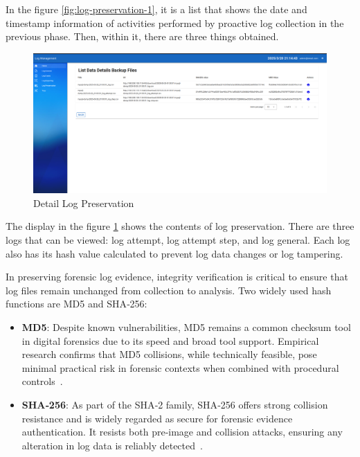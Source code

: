 In the figure \ref{fig:log-preservation-1}, it is a list that shows the date and timestamp information of activities performed by proactive log collection in the previous phase. Then, within it, there are three things obtained.

\begin{figure}[H] 
	\centering
	\includegraphics[width=18cm]{figure/log_preservation_detail.png}
	\caption{Detail Log Preservation}
	\label{fig:log-preservation-2}
\end{figure}

The display in the figure \ref{fig:log-preservation-2} shows the contents of log preservation. There are three logs that can be viewed: log attempt, log attempt step, and log general. Each log also has its hash value calculated to prevent log data changes or log tampering.

In preserving forensic log evidence, integrity verification is critical to ensure that log files remain unchanged from collection to analysis. Two widely used hash functions are MD5 and SHA‑256:
\begin{itemize}
	\item \textbf{MD5}: Despite known vulnerabilities, MD5 remains a common checksum tool in digital forensics due to its speed and broad tool support. Empirical research confirms that MD5 collisions, while technically feasible, pose minimal practical risk in forensic contexts when combined with procedural controls~\cite{easttom2021cryptographic, kessler2016impact}.
	\item \textbf{SHA‑256}: As part of the SHA‑2 family, SHA‑256 offers strong collision resistance and is widely regarded as secure for forensic evidence authentication. It resists both pre‑image and collision attacks, ensuring any alteration in log data is reliably detected~\cite{pagefreezer_sha256, numberanalytics_sha256}.
\end{itemize}

